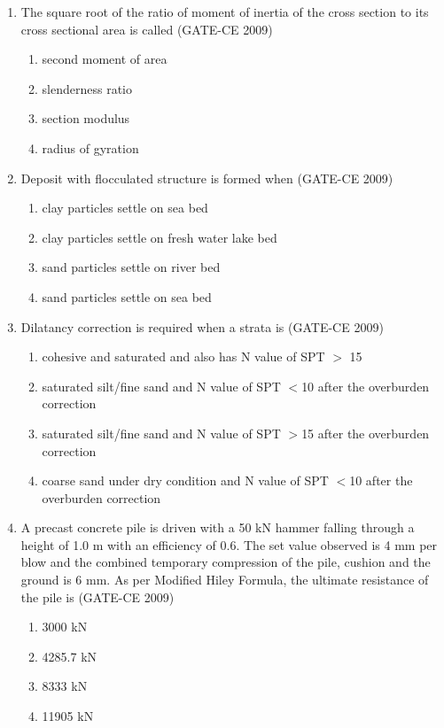 \documentclass[journal,12pt,onecolumn]{article}
\theoremstyle{remark}
\begin{document}
\begin{enumerate}
    \item The square root of the ratio of moment of inertia of the cross section to its cross sectional area is called (GATE-CE 2009)
    \begin{enumerate}
        \item second moment of area 
        \item slenderness ratio 
        \item section modulus 
        \item radius of gyration
    \end{enumerate}
    
    \item Deposit with flocculated structure is formed when (GATE-CE 2009)
    \begin{enumerate}
        \item clay particles settle on sea bed 
        \item clay particles settle on fresh water lake bed 
        \item sand particles settle on river bed 
        \item sand particles settle on sea bed
    \end{enumerate}
    
    \item Dilatancy correction is required when a strata is (GATE-CE 2009)
    \begin{enumerate}
        \item cohesive and saturated and also has N value of SPT $>$ 15
        \item saturated silt/fine sand and N value of SPT $<$10 after the overburden correction
        \item saturated silt/fine sand and N value of SPT $>$15 after the overburden correction
        \item coarse sand under dry condition and N value of SPT $<$10 after the overburden correction
    \end{enumerate}
    
    \item A precast concrete pile is driven with a 50 kN hammer falling through a height of 1.0 m with an efficiency of 0.6. The set value observed is 4 mm per blow and the combined temporary compression of the pile, cushion and the ground is 6 mm. As per Modified Hiley Formula, the ultimate resistance of the pile is (GATE-CE 2009)
    \begin{enumerate}
        \item 3000 kN 
        \item 4285.7 kN 
        \item 8333 kN 
        \item 11905 kN
    \end{enumerate}
    

\end{enumerate}
\end{document}
